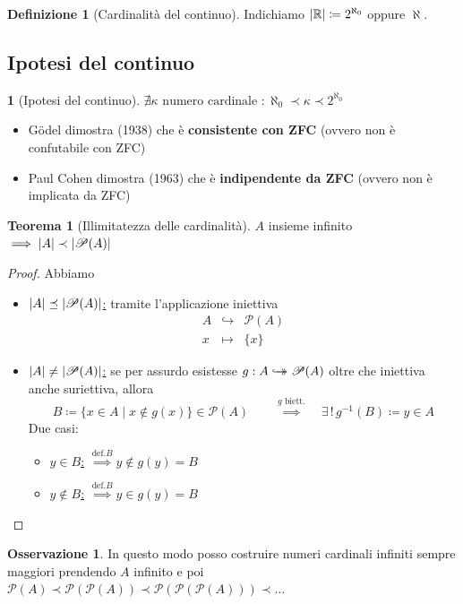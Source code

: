 \documentclass[a4paper,10pt]{article}
\theoremstyle{definition}
\newcommand{\re}{\mathbb{R}} %
\newcommand{\hookdoubleheadrightarrow}{\hookrightarrow\mathrel{\mspace{-15mu}}\rightarrow}
\newcommand{\bij}{\hookdoubleheadrightarrow} %
\theoremstyle{indentdefinition}
\newtheorem{defn}{Definizione}[section]
\theoremstyle{indentpostulate}
\theoremstyle{indenttheorem}
\newtheorem{thm}{Teorema}[section]
\theoremstyle{myremark}
\newtheorem*{rem*}{Osservazione}
\theoremstyle{indentgeneral}
\newtheorem*{gen}{}
\newenvironment{myboxed} 
{\noindent\begin{lrbox}{\mybox}\begin{minipage}{\textwidth}}
{\end{minipage}\end{lrbox}\fbox{\usebox{\mybox}}}
\begin{document}
\begin{defn}[Cardinalità del continuo]
    Indichiamo $\abs{\re}\coloneqq 2^{\aleph_0}$ oppure $\aleph$.
\end{defn}

\subsection{Ipotesi del continuo}
\begin{gen}[Ipotesi del continuo] $\boxed{\nexists\kappa \text{ numero cardinale } : \aleph_0\prec \kappa \prec 2^{\aleph_0}}$
\begin{itemize}
    \item Gödel dimostra (1938) che è \textbf{consistente con ZFC} (ovvero non è confutabile con  ZFC)
    \item Paul Cohen dimostra (1963) che è \textbf{indipendente da ZFC} (ovvero non è implicata da ZFC)
\end{itemize}
\end{gen}

\begin{myboxed}
    \begin{thm}[Illimitatezza delle cardinalità]
        $A$ insieme infinito $\implies\abs{A}\prec\abs{ \mathscr{P}(A)}$
    \end{thm}
\end{myboxed}

\begin{proof} Abbiamo
\begin{itemize}
    \item  \underline{$\abs{A}\preceq\abs{ \mathscr{P}(A)}$:} tramite l'applicazione iniettiva
    $$\begin{array}{ccc}
           A & \hookrightarrow &  \mathscr{P}(A) \\
            x & \mapsto & \{x\}
        \end{array}$$
    \item  \underline{$\abs{A}\neq\abs{ \mathscr{P}(A)}$:} se per assurdo esistesse $g:A \bij  \mathscr{P}(A)$ oltre che iniettiva anche suriettiva, allora
    $$B\coloneqq\{x\in A\mid x\notin g(x)\}\in\mathscr{P}(A)\qquad\overset{g\text{ biett.}}{\implies}\quad\exists\,!\,g^{-1}(B)\coloneqq y\in A$$
    Due casi:
    \begin{itemize}
        \item \underline{$y\in B$:} $\overset{\text{def.}B}{\implies}y\notin g(y)=B$ \lightning
        \item \underline{$y\notin B$:} $\overset{\text{def.}B}{\implies}y\in g(y)=B$ \lightning
    \end{itemize}
\end{itemize}
\end{proof}
\begin{rem*}
    In questo modo posso costruire numeri cardinali infiniti sempre maggiori prendendo $A$ infinito e poi $\mathscr{P}(A)\prec \mathscr{P}(\mathscr{P}(A))\prec \mathscr{P}(\mathscr{P}(\mathscr{P}(A)))\prec \dots$
\end{rem*}
\end{document}
